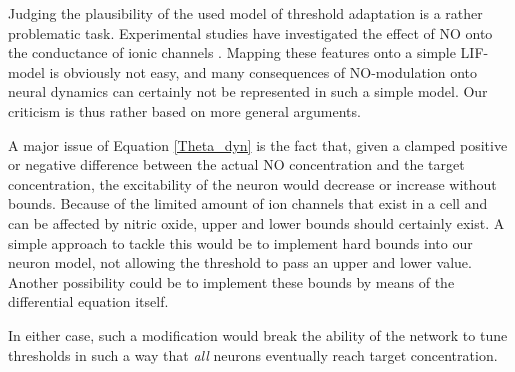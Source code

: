 \documentclass[10pt,a4paper]{article}
\begin{document}
Judging the plausibility of the used model of threshold adaptation is a rather problematic task. Experimental studies have investigated the effect of NO onto the conductance of ionic channels \cite{Steinert_NO,Steinert_NO_2011}. Mapping these features onto a simple LIF-model is obviously not easy, and many consequences of NO-modulation onto neural dynamics can certainly not be represented in such a simple model. Our criticism is thus rather based on more general arguments.

A major issue of Equation \eqref{Theta_dyn} is the fact that, given a clamped positive or negative difference between the actual NO concentration and the target concentration, the excitability of the neuron would decrease or increase without bounds. Because of the limited amount of ion channels that exist in a cell and can be affected by nitric oxide, upper and lower bounds should certainly exist. A simple approach to tackle this would be to implement hard bounds into our neuron model, not allowing the threshold to pass an upper and lower value. Another possibility could be to implement these bounds by means of the differential equation itself.

In either case, such a modification would break the ability of the network to tune thresholds in such a way that \emph{all} neurons eventually reach target concentration. 


 



\end{document}
